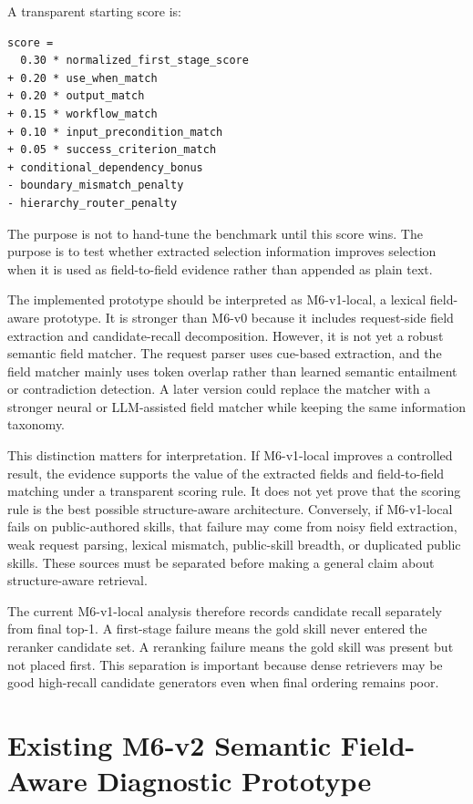 A transparent starting score is:

\begin{verbatim}
score =
  0.30 * normalized_first_stage_score
+ 0.20 * use_when_match
+ 0.20 * output_match
+ 0.15 * workflow_match
+ 0.10 * input_precondition_match
+ 0.05 * success_criterion_match
+ conditional_dependency_bonus
- boundary_mismatch_penalty
- hierarchy_router_penalty
\end{verbatim}

The purpose is not to hand-tune the benchmark until this score wins. The purpose is to test whether extracted selection information improves selection when it is used as field-to-field evidence rather than appended as plain text.

The implemented prototype should be interpreted as M6-v1-local, a lexical field-aware prototype. It is stronger than M6-v0 because it includes request-side field extraction and candidate-recall decomposition. However, it is not yet a robust semantic field matcher. The request parser uses cue-based extraction, and the field matcher mainly uses token overlap rather than learned semantic entailment or contradiction detection. A later version could replace the matcher with a stronger neural or LLM-assisted field matcher while keeping the same information taxonomy.

This distinction matters for interpretation. If M6-v1-local improves a controlled result, the evidence supports the value of the extracted fields and field-to-field matching under a transparent scoring rule. It does not yet prove that the scoring rule is the best possible structure-aware architecture. Conversely, if M6-v1-local fails on public-authored skills, that failure may come from noisy field extraction, weak request parsing, lexical mismatch, public-skill breadth, or duplicated public skills. These sources must be separated before making a general claim about structure-aware retrieval.

The current M6-v1-local analysis therefore records candidate recall separately from final top-1. A first-stage failure means the gold skill never entered the reranker candidate set. A reranking failure means the gold skill was present but not placed first. This separation is important because dense retrievers may be good high-recall candidate generators even when final ordering remains poor.

\section{Existing M6-v2 Semantic Field-Aware Diagnostic Prototype}

